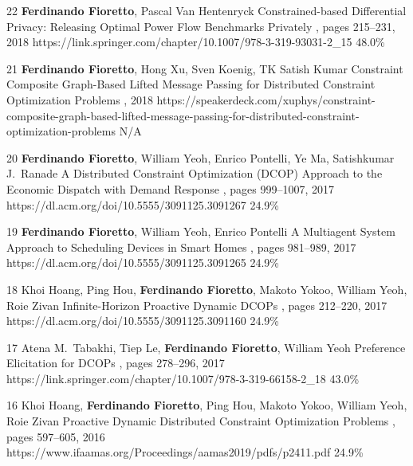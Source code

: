 \begin{pubs}
	\confentry 
		{22} %
		{{\bf Ferdinando Fioretto}, Pascal Van Hentenryck}
		{Constrained-based Differential Privacy: Releasing Optimal Power Flow Benchmarks Privately} 
		{\procCPAIOR, pages 215--231, 2018}
		{https://link.springer.com/chapter/10.1007/978-3-319-93031-2\_15}
	    {48.0\%}

	\confentry
		{21} %
		{{\bf Ferdinando Fioretto}, Hong Xu, Sven Koenig, TK Satish Kumar}
		{Constraint Composite Graph-Based Lifted Message Passing for Distributed Constraint Optimization Problems}
		{\procISIAM, 2018}
		{https://speakerdeck.com/xuphys/constraint-composite-graph-based-lifted-message-passing-for-distributed-constraint-optimization-problems}
		{N/A}

	\confentry 
		{20} %
		{{\bf Ferdinando Fioretto}, William Yeoh, Enrico Pontelli, Ye Ma, Satishkumar J.~Ranade}
		{A Distributed Constraint Optimization (DCOP) Approach to the Economic Dispatch with Demand Response}
		{\procAAMAS, pages  999--1007, 2017}
		{https://dl.acm.org/doi/10.5555/3091125.3091267}
		{24.9\%}%

	\confentry 
		{19} %
		{{\bf Ferdinando Fioretto},  William Yeoh, Enrico Pontelli}
		{A Multiagent System Approach to Scheduling Devices in Smart Homes}
		{\procAAMAS, pages 981--989, 2017} 
		{https://dl.acm.org/doi/10.5555/3091125.3091265}
		{24.9\%}%

	\confentry
		{18} %
		{Khoi Hoang, Ping Hou, {\bf Ferdinando Fioretto}, Makoto Yokoo, William Yeoh, Roie Zivan}
		{Infinite-Horizon Proactive Dynamic DCOPs}
		{\procAAMAS, pages 212--220, 2017}
		{https://dl.acm.org/doi/10.5555/3091125.3091160}
		{24.9\%}%

	\confentry 
		{17} %
		{Atena M.~Tabakhi, Tiep Le, {\bf Ferdinando Fioretto}, William Yeoh}
		{Preference Elicitation for DCOPs}
		{\procCP, pages 278--296, 2017}
		{https://link.springer.com/chapter/10.1007/978-3-319-66158-2\_18}
		{43.0\%}%

	\confentry 
		{16} %
		{Khoi Hoang, {\bf Ferdinando Fioretto}, Ping Hou, Makoto Yokoo, William Yeoh, Roie Zivan}
		{Proactive Dynamic Distributed Constraint Optimization Problems} 
		{\procAAMAS, pages 597--605, 2016}
		{https://www.ifaamas.org/Proceedings/aamas2019/pdfs/p2411.pdf}
		{24.9\%}%


\end{pubs}
